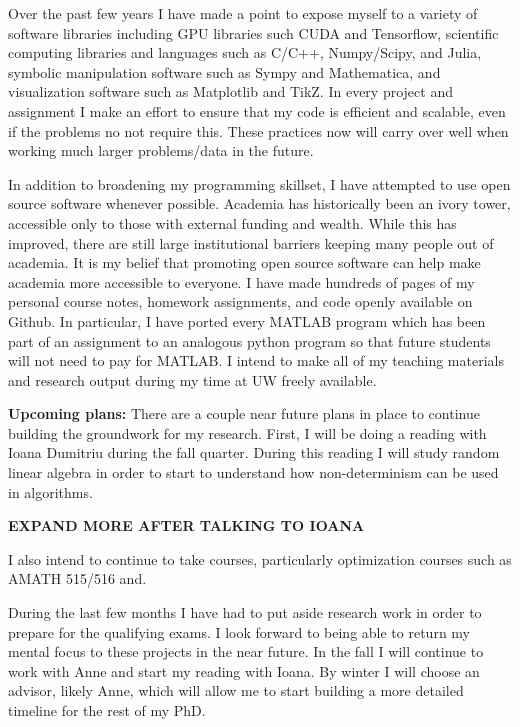 \documentclass[11pt]{article}
\begin{document}
Over the past few years I have made a point to expose myself to a variety of software libraries including GPU libraries such CUDA and Tensorflow, scientific computing libraries and languages such as C/C++, Numpy/Scipy, and Julia, symbolic manipulation software such as Sympy and Mathematica, and visualization software such as Matplotlib and TikZ. In every project and assignment I make an effort to ensure that my code is efficient and scalable, even if the problems no not require this. These practices now will carry over well when working much larger problems/data in the future.

In addition to broadening my programming skillset, I have attempted to use open source software whenever possible. 
Academia has historically been an ivory tower, accessible only to those with external funding and wealth. While this has improved, there are still large institutional barriers keeping many people out of academia. It is my belief that promoting open source software can help make academia more accessible to everyone.
I have made hundreds of pages of my personal course notes, homework assignments, and code openly available on Github. In particular, I have ported every MATLAB program which has been part of an assignment to an analogous python program so that future students will not need to pay for MATLAB. 
I intend to make all of my teaching materials and research output during my time at UW freely available.


\textbf{Upcoming plans:}
There are a couple near future plans in place to continue building the groundwork for my research. First, I will be doing a reading with Ioana Dumitriu during the fall quarter.
During this reading I will study random linear algebra in order to start to understand how non-determinism can be used in algorithms. 

\textbf{EXPAND MORE AFTER TALKING TO IOANA}

I also intend to continue to take courses, particularly optimization courses such as AMATH 515/516 and.

During the last few months I have had to put aside research work in order to prepare for the qualifying exams. I look forward to being able to return my mental focus to these projects in the near future. In the fall I will continue to work with Anne and start my reading with Ioana. By winter I will choose an advisor, likely Anne, which will allow me to start building a more detailed timeline for the rest of my PhD.






\end{document}

